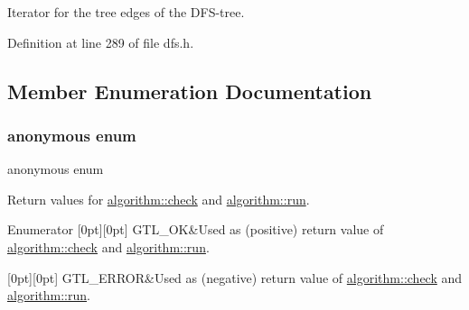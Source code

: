 Iterator for the tree edges of the D\+F\+S-\/tree. 



Definition at line 289 of file dfs.\+h.



\subsection{Member Enumeration Documentation}
\mbox{\label{classalgorithm_af1a0078e153aa99c24f9bdf0d97f6710}} 
\subsubsection{\texorpdfstring{anonymous enum}{anonymous enum}}
{\footnotesize\ttfamily anonymous enum\hspace{0.3cm}{\ttfamily [inherited]}}



Return values for \mbox{\hyperlink{classalgorithm_a76361fb03ad1cf643affc51821e43bed}{algorithm\+::check}} and \mbox{\hyperlink{classalgorithm_a734b189509a8d6b56b65f8ff772d43ca}{algorithm\+::run}}. 

\begin{DoxyEnumFields}{Enumerator}
[0pt][0pt]{}\mbox{\label{classalgorithm_af1a0078e153aa99c24f9bdf0d97f6710a5114c20e4a96a76b5de9f28bf15e282b}} 
G\+T\+L\+\_\+\+OK&Used as (positive) return value of \mbox{\hyperlink{classalgorithm_a76361fb03ad1cf643affc51821e43bed}{algorithm\+::check}} and \mbox{\hyperlink{classalgorithm_a734b189509a8d6b56b65f8ff772d43ca}{algorithm\+::run}}. \\
\hline

[0pt][0pt]{}\mbox{\label{classalgorithm_af1a0078e153aa99c24f9bdf0d97f6710a6fcf574690bbd6cf710837a169510dd7}} 
G\+T\+L\+\_\+\+E\+R\+R\+OR&Used as (negative) return value of \mbox{\hyperlink{classalgorithm_a76361fb03ad1cf643affc51821e43bed}{algorithm\+::check}} and \mbox{\hyperlink{classalgorithm_a734b189509a8d6b56b65f8ff772d43ca}{algorithm\+::run}}. \\
\hline

\end{DoxyEnumFields}


